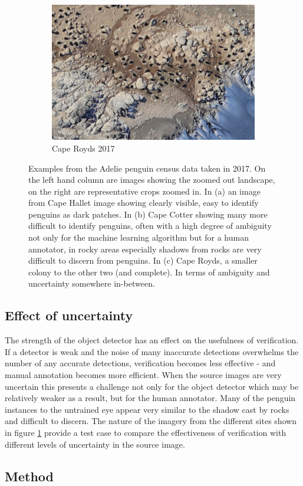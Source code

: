 \begin{figure}[h!]
\begin{subfigure}[t]{1.0\linewidth}
  \hfill
  \includegraphics[width=0.475\linewidth]{figures/annotation/penguin/royds.jpg}
  \caption{Cape Royds 2017}
\end{subfigure}

\caption{Examples from the Adelie penguin census data taken in 2017. On the left hand column are images showing the zoomed out landscape, on the right are representative crops zoomed in.  In (a) an image from Cape Hallet image showing clearly visible, easy to identify penguins as dark patches. In (b) Cape Cotter showing many more difficult to identify penguins, often with a high degree of ambiguity not only for the machine learning algorithm but for a human annotator, in rocky areas especially shadows from rocks are very difficult to discern from penguins. In (c) Cape Royds, a smaller colony to the other two (and complete). In terms of ambiguity and uncertainty somewhere in-between. }
\label {fig:penguin_examples}
\end{figure}


\subsection {Effect of uncertainty}

 The strength of the object detector has an effect on the usefulness of verification. If a detector is weak and the noise of many inaccurate detections overwhelms the number of any accurate detections, verification becomes less effective - and manual annotation becomes more efficient. When the source images are very uncertain this presents a challenge not only for the object detector which may be relatively weaker as a result, but for the human annotator. Many of the penguin instances to the untrained eye appear very similar to the shadow cast by rocks and difficult to discern. The nature of the imagery from the different sites shown in figure \ref{fig:penguin_examples} provide a test case to compare the effectiveness of verification with different levels of uncertainty in the source image. 

\subsection {Method}

